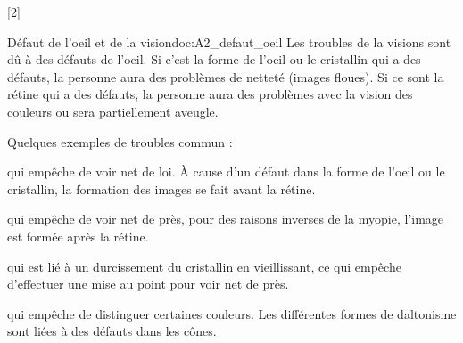 [2]


\begin{doc}{Défaut de l'oeil et de la vision}{doc:A2_defaut_oeil}
  Les troubles de la visions sont dû à des défauts de l'oeil.
  Si c'est la forme de l'oeil ou le cristallin qui a des défauts, la personne aura des problèmes de netteté (images floues).
  Si ce sont la rétine qui a des défauts, la personne aura des problèmes avec la vision des couleurs ou sera partiellement aveugle.

  Quelques exemples de troubles commun :
  \begin{listePoints}
    \item {} qui empêche de voir net de loi. À cause d'un défaut dans la forme de l'oeil ou le cristallin, la formation des images se fait avant la rétine.
    \item {} qui empêche de voir net de près, pour des raisons inverses de la myopie, l'image est formée après la rétine.
    \item {} qui est lié à un durcissement du cristallin en vieillissant, ce qui empêche d'effectuer une mise au point pour voir net de près.
    \item {} qui empêche de distinguer certaines couleurs. Les différentes formes de daltonisme sont liées à des défauts dans les cônes.
  \end{listePoints}
\end{doc}
